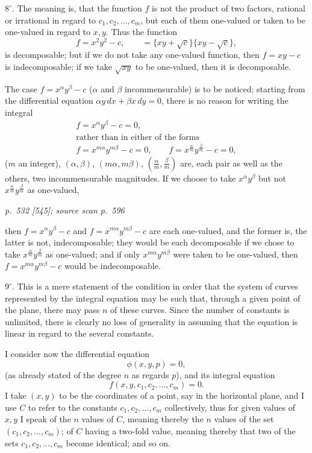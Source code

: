 \documentclass[11pt,a4paper]{article}
\newcommand{\sourcepage}[3]{%
  \bigskip
  \noindent\textit{p.~#1 [#2]; source scan p.~#3}%
  \par\smallskip
}
\begin{document}
$8^\circ$. The meaning is, that the function $f$ is not the product of two factors, rational
or irrational in regard to $c_1,c_2,\ldots,c_m$, but each of them one-valued or taken to be
one-valued in regard to $x,y$. Thus the function
\[
f=x^2y^2-c,\qquad =\{xy+\sqrt{c}\}\{xy-\sqrt{c}\},
\]
is decomposable; but if we do not take any one-valued function, then $f=xy-c$ is
indecomposable; if we take $\sqrt{xy}$ to be one-valued, then it is decomposable.

The case $f=x^\alpha y^\beta-c$ ($\alpha$ and $\beta$ incommensurable) is to be noticed; starting from
the differential equation $\alpha y\,dx+\beta x\,dy=0$, there is no reason for writing the integral
\[
\begin{gathered}
f=x^\alpha y^\beta-c=0,\\
\text{rather than in either of the forms}\\
f=x^{m\alpha}y^{m\beta}-c=0,\qquad
f=x^{\frac{\alpha}{m}}y^{\frac{\beta}{m}}-c=0,
\end{gathered}
\]
($m$ an integer), $(\alpha,\beta)$, $(m\alpha,m\beta)$, $\left(\frac{\alpha}{m},\frac{\beta}{m}\right)$ are,
each pair as well as the others, two incommensurable magnitudes. If we choose to take
$x^\alpha y^\beta$ but not $x^{\frac{\alpha}{m}}y^{\frac{\beta}{m}}$ as one-valued,

\clearpage

\sourcepage{532}{545}{596}
then $f=x^\alpha y^\beta-c$ and $f=x^{m\alpha}y^{m\beta}-c$ are each one-valued, and the former is, the latter
is not, indecomposable; they would be each decomposable if we chose to take
$x^{\frac{\alpha}{m}}y^{\frac{\beta}{m}}$ as one-valued; and if only $x^{m\alpha}y^{m\beta}$ were taken to be
one-valued, then $f=x^{m\alpha}y^{m\beta}-c$ would be indecomposable.

$9^\circ$. This is a mere statement of the condition in order that the system of curves
represented by the integral equation may be such that, through a given point of the
plane, there may pass $n$ of these curves. Since the number of constants is unlimited,
there is clearly no loss of generality in assuming that the equation is linear in regard
to the several constants.

I consider now the differential equation
\[
\phi(x,y,p)=0,
\]
(as already stated of the degree $n$ as regards $p$), and its integral equation
\[
f(x,y,c_1,c_2,\ldots,c_m)=0.
\]
I take $(x,y)$ to be the coordinates of a point, say in the horizontal plane, and I use
$C$ to refer to the constants $c_1,c_2,\ldots,c_m$ collectively, thus for given values of $x,y$ I speak
of the $n$ values of $C$, meaning thereby the $n$ values of the set $(c_1,c_2,\ldots,c_m)$; of $C$
having a two-fold value, meaning thereby that two of the sets $c_1,c_2,\ldots,c_m$ become
identical; and so on.
\end{document}
